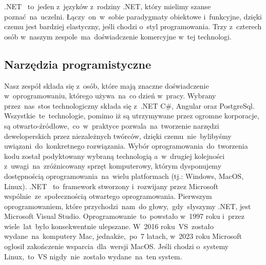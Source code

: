 \indent .NET ~to~jeden z~języków z~rodziny .NET, który mielimy szanse poznać~na~uczelni.
Łączy~on~w~sobie paradygmaty obiektowe i~funkcyjne, dzięki czemu jest bardziej elastyczny, jeśli chodzi o~styl programowania.
Trzy z~czterech osób w~naszym zespole~ma~doświadczenie komercyjne w~tej technologi.


\subsection{Narzędzia programistyczne}
\label{subsec:narzedzia-programistyczne}
\indent Nasz zespół składa się z~osób, które mają znaczne doświadczenie w~oprogramowaniu, którego używa~na~co dzień w~pracy.
Wybrany przez~nas~stos technologiczny składa się z~.NET C\#, Angular oraz PostgreSql.
Wszystkie~te~technologie, pomimo iż są utrzymywane przez ogromne korporacje, są otwarto-źródłowe,~co~w~praktyce pozwala~na~tworzenie narzędzi deweloperskich przez niezależnych twórców, dzięki czemu~nie~bylibyśmy uwiązani~do~konkretnego rozwiązania.
Wybór oprogramowania~do~tworzenia kodu został podyktowany wybraną technologią a~w~drugiej kolejności z~uwagi~na~zróżnicowany sprzęt komputerowy, którym dysponujemy  dostępnością oprogramowania~na~wielu platformach (tj.: Windows, MacOS, Linux).
\newline \indent .NET ~to~framework stworzony i~rozwijany przez Microsoft wspólnie~ze~społecznością otwartego oprogramowania.
Pierwszym oprogramowaniem, które przychodzi~nam~do głowy,~gdy~słyszymy .NET, jest Microsoft Visual Studio.
Oprogramowanie~to~powstało w~1997 roku i~przez wiele~lat~było konsekwentnie ulepszane.
W~2016 roku~VS~zostało wydane~na~komputery Mac, jednakże,~po~7 latach, w~2023 roku Microsoft ogłosił zakończenie wsparcia~dla~wersji MacOS.
Jeśli chodzi o~systemy Linux,~to~VS nigdy~nie~zostało wydane~na~ten system.

